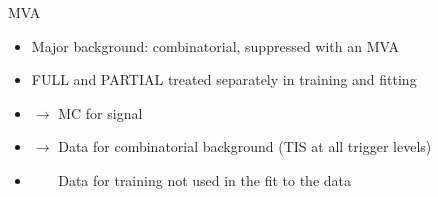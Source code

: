 \documentclass[9pt,hyperref={unicode},utf8]{beamer}
\begin{document}
\begin{frame}{MVA}
 \begin{itemize}
  \setlength\itemsep{0.3em}
  \item Major background: combinatorial, suppressed with an MVA
  \item FULL and PARTIAL treated separately in training and fitting
  \item[] $\rightarrow$ MC for signal
  \item[] $\rightarrow$ Data for combinatorial background (TIS at all trigger levels)
  \item[] \textcolor{white}{$\rightarrow$} Data for training not used in the fit to the data
 \end{itemize}
 \end{frame}
\end{document}
